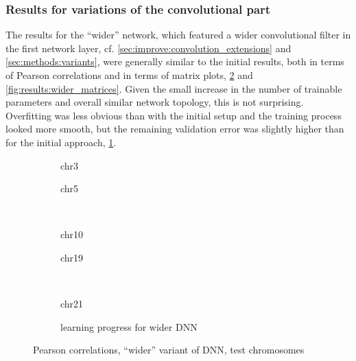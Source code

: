 \subsubsection{Results for variations of the convolutional part} \label{sec:results:wider-longer-etc}
The results for the ``wider'' network, which featured a wider convolutional filter in the first network layer, 
cf. \cref{sec:improve:convolution_extensions} and \ref{sec:methods:variants}, 
were generally similar to the initial results, both in terms of Pearson correlations and in terms of matrix plots, 
\cref{fig:results:widerDNN_pearson} and \ref{fig:results:wider_matrices}.
Given the small increase in the number of trainable parameters and overall similar network topology, this is not surprising.
Overfitting was less obvious than with the initial setup and the training process looked more smooth, 
but the remaining validation error was slightly higher than for the initial approach, \cref{fig:results:widerDNN_lossEpochs}.
\begin{figure}[p] %
    \begin{subfigure}{0.45\textwidth}
        \scriptsize
        \caption{chr3}
    \end{subfigure} \hfill
    \begin{subfigure}{0.45\textwidth}
        \scriptsize
        \caption{chr5}
    \end{subfigure}\\[5mm]
    \begin{subfigure}{0.45\textwidth}
        \scriptsize
        \caption{chr10}
    \end{subfigure}\hfill
    \begin{subfigure}{0.45\textwidth}
        \scriptsize
        \caption{chr19}
    \end{subfigure}\\[3mm]
    \centering
    \begin{subfigure}{0.45\textwidth}
        \scriptsize
        \caption{chr21}
    \end{subfigure}\hfill
    \begin{subfigure}{0.45\textwidth}
        \caption{learning progress for wider DNN} \label{fig:results:widerDNN_lossEpochs}
    \end{subfigure}
    \caption{Pearson correlations, ``wider'' variant of DNN,  test chromosomes}
    \label{fig:results:widerDNN_pearson}
\end{figure}
